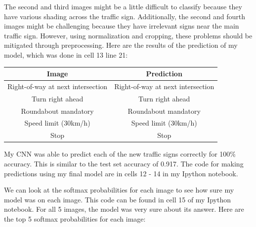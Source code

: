 \documentclass[12pt]{article}
\begin{document}
The second and third images might be a little difficult to classify because they have various shading across the traffic sign. Additionally, the second and fourth images might be challenging because they have irrelevant signs near the main traffic sign. However, using normalization and cropping, these problems should be mitigated through preprocessing. Here are the results of the prediction of my model, which was done in cell 13 line 21:
\begin{center}
\begin{tabular}{|c|c|}
\hline
\textbf{Image} & \textbf{Prediction} \\
\hline
Right-of-way at next intersection & Right-of-way at next intersection \\
\hline
Turn right ahead & Turn right ahead \\
\hline
Roundabout mandatory & Roundabout mandatory \\
\hline
Speed limit (30km/h) & Speed limit (30km/h) \\
\hline
Stop & Stop \\
\hline
\end{tabular}
\end{center}
My CNN was able to predict each of the new traffic signs correctly for 100\% accuracy. This is similar to the test set accuracy of 0.917. The code for making predictions using my final model are in cells 12 - 14 in my Ipython notebook. 

We can look at the softmax probabilities for each image to see how sure my model was on each image. This code can be found in cell 15 of my Ipython notebook. For all 5 images, the model was very sure about its answer. Here are the top 5 softmax probabilities for each image:
\end{document}
